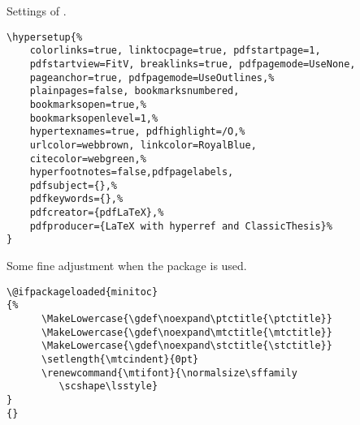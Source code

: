 Settings of .
\begin{lstlisting}
\hypersetup{%
    colorlinks=true, linktocpage=true, pdfstartpage=1,
    pdfstartview=FitV, breaklinks=true, pdfpagemode=UseNone,
    pageanchor=true, pdfpagemode=UseOutlines,%
    plainpages=false, bookmarksnumbered,
    bookmarksopen=true,%
    bookmarksopenlevel=1,%
    hypertexnames=true, pdfhighlight=/O,%
    urlcolor=webbrown, linkcolor=RoyalBlue,
    citecolor=webgreen,%
    hyperfootnotes=false,pdfpagelabels,
    pdfsubject={},%
    pdfkeywords={},%
    pdfcreator={pdfLaTeX},%
    pdfproducer={LaTeX with hyperref and ClassicThesis}%
}
\end{lstlisting}



Some fine adjustment when the  package is used.
\begin{lstlisting}
\@ifpackageloaded{minitoc}
{%
      \MakeLowercase{\gdef\noexpand\ptctitle{\ptctitle}}
      \MakeLowercase{\gdef\noexpand\mtctitle{\mtctitle}}
      \MakeLowercase{\gdef\noexpand\stctitle{\stctitle}}
      \setlength{\mtcindent}{0pt}
      \renewcommand{\mtifont}{\normalsize\sffamily
         \scshape\lsstyle}
}
{}
\end{lstlisting}


